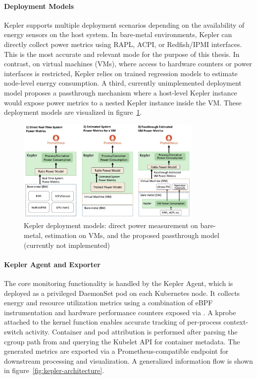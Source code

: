\paragraph{Deployment Models}
Kepler supports multiple deployment scenarios depending on the availability of energy sensors on the host system. In bare-metal environments, Kepler can directly collect power metrics using RAPL, ACPI, or Redfish/IPMI interfaces. This is the most accurate and relevant mode for the purpose of this thesis. In contrast, on virtual machines (VMs), where access to hardware counters or power interfaces is restricted, Kepler relies on trained regression models to estimate node-level energy consumption. A third, currently unimplemented deployment model proposes a passthrough mechanism where a host-level Kepler instance would expose power metrics to a nested Kepler instance inside the VM. These deployment models are visualized in figure~\ref{fig:kepler-deployment-modes}.

\begin{figure}[ht]
  \centering
  \includegraphics[width=0.8\textwidth]{Figures/kepler_deployment_modes.jpg}
  \caption{Kepler deployment models: direct power measurement on bare-metal, estimation on VMs, and the proposed passthrough model (currently not implemented)\parencite{kepler_docs}}
  \label{fig:kepler-deployment-modes}
\end{figure}

\paragraph{Kepler Agent and Exporter}
The core monitoring functionality is handled by the Kepler Agent, which is deployed as a privileged DaemonSet pod on each Kubernetes node. It collects energy and resource utilization metrics using a combination of eBPF instrumentation and hardware performance counters exposed via . A kprobe attached to the  kernel function enables accurate tracking of per-process context-switch activity. Container and pod attribution is performed after parsing the cgroup path from  and querying the Kubelet API for container metadata. The generated metrics are exported via a Prometheus-compatible endpoint for downstream processing and visualization. A generalized information flow is shown in figure~\ref{fig:kepler-architecture}.

